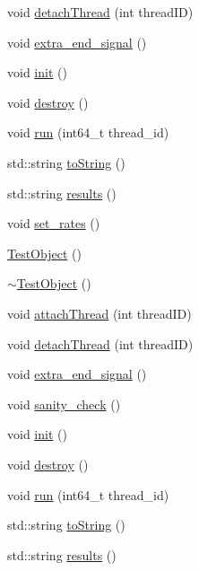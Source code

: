 \begin{DoxyCompactItemize}
\item 
void \hyperlink{class_test_object_acf21dd1257cae9a96c4ea39233929027}{detach\+Thread} (int thread\+I\+D)
\item 
void \hyperlink{class_test_object_a7c5bccd9eb5900850169d39a22db8c53}{extra\+\_\+end\+\_\+signal} ()
\item 
void \hyperlink{class_test_object_acc6255f8f3e0f9e1a09955cc7f53caff}{init} ()
\item 
void \hyperlink{class_test_object_a30dbc74cb72669dd4d0cec14baa92bc9}{destroy} ()
\item 
void \hyperlink{class_test_object_ae0ac39cc52730e2c60961ea495b34550}{run} (int64\+\_\+t thread\+\_\+id)
\item 
std\+::string \hyperlink{class_test_object_af09564f241ed447b17ab16ef751eef8e}{to\+String} ()
\item 
std\+::string \hyperlink{class_test_object_a39bb7ef595355ab7459e992b85b045d8}{results} ()
\item 
void \hyperlink{class_test_object_adfad75ad3f6c014f68ff2cdc4e752fc9}{set\+\_\+rates} ()
\item 
\hyperlink{class_test_object_a3d0036f18982129567596b06d72087b6}{Test\+Object} ()
\item 
\hyperlink{class_test_object_a3262a3065422e5ebd007e38c4c50d01f}{$\sim$\+Test\+Object} ()
\item 
void \hyperlink{class_test_object_a9aec85cd402d269ccf81cca9dcb4c31e}{attach\+Thread} (int thread\+I\+D)
\item 
void \hyperlink{class_test_object_acf21dd1257cae9a96c4ea39233929027}{detach\+Thread} (int thread\+I\+D)
\item 
void \hyperlink{class_test_object_a7c5bccd9eb5900850169d39a22db8c53}{extra\+\_\+end\+\_\+signal} ()
\item 
void \hyperlink{class_test_object_a147ed57b86118d03111f83b074828ab8}{sanity\+\_\+check} ()
\item 
void \hyperlink{class_test_object_acc6255f8f3e0f9e1a09955cc7f53caff}{init} ()
\item 
void \hyperlink{class_test_object_a30dbc74cb72669dd4d0cec14baa92bc9}{destroy} ()
\item 
void \hyperlink{class_test_object_ae0ac39cc52730e2c60961ea495b34550}{run} (int64\+\_\+t thread\+\_\+id)
\item 
std\+::string \hyperlink{class_test_object_af09564f241ed447b17ab16ef751eef8e}{to\+String} ()
\item 
std\+::string \hyperlink{class_test_object_a39bb7ef595355ab7459e992b85b045d8}{results} ()

\end{DoxyCompactItemize}
